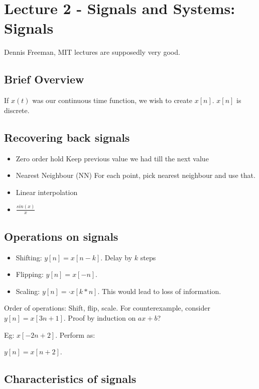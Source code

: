 \documentclass{article}
\begin{document}
\section{Lecture 2 - Signals and Systems: Signals}
Dennis Freeman, MIT lectures are supposedly very good.

\subsection{Brief Overview}

If $x(t)$ was our continuous time function, we wish to create
$x[n]$. $x[n]$ is discrete.

\subsection{Recovering back signals}
\begin{itemize}
    \item Zero order hold
        Keep previous value we had till the next value
    \item Nearest Neighbour (NN)
        For each point, pick nearest neighbour and use that.
    \item Linear interpolation
    \item $\frac{sin(x)}{x}$
\end{itemize}


\subsection{Operations on signals}

\begin{itemize}
    \item Shifting: $y[n] = x[n - k]$. Delay by $k$ steps
    \item Flipping: $y[n] = x[-n]$.
    \item Scaling: $y[n] = \cdot x[k * n]$. This would lead to loss of information.
\end{itemize}

Order of operations: Shift, flip, scale. For counterexample, consider
$y[n] = x[3n + 1]$. Proof by induction on $ax + b$?

Eg: $x[-2n + 2]$. Perform as:

$y[n] = x[n + 2]$.

\subsection{Characteristics of signals}
\end{document}

